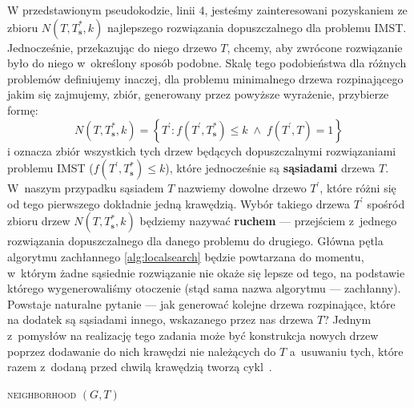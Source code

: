 W przedstawionym pseudokodzie, linii $4$, jesteśmy zainteresowani pozyskaniem ze zbioru $N \left( T, T^{\ast}_{\textbf{s}}, k \right)$ najlepszego rozwiązania dopuszczalnego dla problemu \textsc{IMST}. Jednocześnie, przekazując do niego drzewo $T$, chcemy, aby zwrócone rozwiązanie było do niego w~określony sposób podobne. Skalę tego podobieństwa dla różnych problemów definiujemy inaczej, dla problemu minimalnego drzewa rozpinającego jakim się zajmujemy, zbiór, generowany przez powyższe wyrażenie, przybierze formę:
\begin{equation}
	N \left( T, T^{\ast}_{\textbf{s}}, k \right) = \left\{ T^{\prime} : f \left( T^{\prime}, T^{\ast}_{\textbf{s}} \right) \leqslant k \; \wedge \; f \left( T^{\prime}, T \right) = 1 \right\}
\end{equation}
i oznacza zbiór wszystkich tych drzew będących dopuszczalnymi rozwiązaniami problemu \textsc{IMST} ($f \left( T^{\prime}, T^{\ast}_{\textbf{s}} \right) \leqslant k$), które jednocześnie są \textbf{sąsiadami} drzewa $T$. W~naszym przypadku sąsiadem $T$ nazwiemy dowolne drzewo $T^{\prime}$, które różni się od tego pierwszego dokładnie jedną krawędzią. Wybór takiego drzewa $T^{\prime}$ spośród zbioru drzew $N \left( T, T^{\ast}_{\textbf{s}}, k \right)$ będziemy nazywać \textbf{ruchem} --- przejściem z~jednego rozwiązania dopuszczalnego dla danego problemu do drugiego. Główna pętla algorytmu zachłannego \ref{alg:localsearch} będzie powtarzana do momentu, w~którym żadne sąsiednie rozwiązanie nie okaże się lepsze od tego, na podstawie którego wygenerowaliśmy otoczenie (stąd sama nazwa algorytmu --- zachłanny). Powstaje naturalne pytanie --- jak generować kolejne drzewa rozpinające, które na dodatek są sąsiadami innego, wskazanego przez nas drzewa $T$? Jednym z~pomysłów na realizację tego zadania może być konstrukcja nowych drzew poprzez dodawanie do nich krawędzi nie należących do $T$ a~usuwaniu tych, które razem z~dodaną przed chwilą krawędzią tworzą cykl~\cite{Kasperski2012}.

\begin{pseudokod}[!hbtp]
	\DontPrintSemicolon
	\caption{\textsc{neighborhood} $\left( G, T \right)$}
	\label{alg:neighborhood}
\end{pseudokod}

